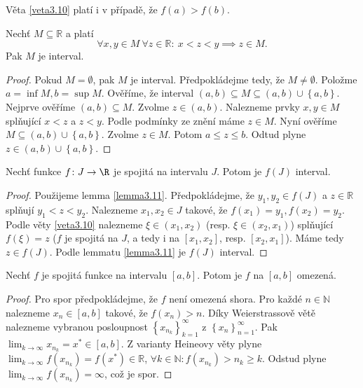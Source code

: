 \begin{poznamka}
	Věta \ref{veta3.10} platí i v případě, že $f(a) >f(b)$.
\end{poznamka}

\begin{lemma}\label{lemma3.11} %
Nechť $M\subseteq \mathbb R $ a platí
$$\forall x,y\in M\ \forall z\in \mathbb R :\ x<z<y\implies z\in M.$$
Pak $M$ je interval.
\end{lemma}

\begin{proof}
	Pokud $M = \emptyset$, pak $M$ je interval. Předpokládejme tedy, že $M\ne \emptyset$.
	Položme $a=\inf M, b =\sup M$. Ověříme, že interval $(a,b) \subseteq M \subseteq (a,b)\cup \left \{ a,b \right \} $.
	Nejprve ověříme $(a,b) \subseteq M$. Zvolme $z\in (a,b)$. Nalezneme prvky $x,y\in M$ splňující
	$x<z$ a $z<y$. Podle podmínky ze znění máme $z\in M$. Nyní ověříme $M \subseteq (a,b)\cup \left \{ a,b \right \} $.
	Zvolme $z\in M$. Potom $a\leq z\leq b$. Odtud plyne $z\in(a,b) \cup \left \{ a,b \right \} $.
\end{proof}

\begin{veta}\label{veta3.12} %
Nechť funkce $f\colon J\to\R$ je spojitá na intervalu $J$. Potom je $f(J)$ interval.
\end{veta}

\begin{proof}
	Použijeme lemma \ref{lemma3.11}. Předpokládejme, že $y_1,y_2 \in f(J)$ a $z\in \mathbb R $
	splňují $y_1 < z < y_2$. Nalezneme $x_1,x_2 \in J$ takové, že $f(x_1) = y_1, f(x_2) = y_2$.
	Podle věty \ref{veta3.10} nalezneme $\xi \in (x_1, x_2)$ (resp. $\xi \in (x_2, x_1)$) splňující
	$f(\xi) = z$ ($f$ je spojitá na $J$, a tedy i na $\left [ x_1,x_2 \right ] $, resp. $\left [ x_2,x_1 \right ] $).
	Máme tedy $z\in f(J)$. Podle lemmatu \ref{lemma3.11} je $f(J)$ interval.
\end{proof}

\begin{veta}\label{veta3.13}%
Nechť $f$ je spojitá funkce na intervalu $[a,b]$. Potom je $f$ na $[a,b]$ omezená.
\end{veta}

\begin{proof}
	Pro spor předpokládejme, že $f$ není omezená shora. Pro každé $n\in \mathbb N $
	nalezneme $x_n \in \left [ a,b \right ] $ takové, že $f(x_n) > n$. Díky Weierstrassově větě
	nalezneme vybranou posloupnost $\left \{ x_{n_k} \right \}_{k=1}^\infty $ z $\left \{ x_n \right \}_{n=1}^\infty $.
	Pak $\lim_{k \to \infty} x_{n_k} = x^* \in \left [ a,b \right ] $. Z varianty Heineovy věty plyne
	$\lim_{k \to \infty} f(x_{n_k})=f(x^*)\in \mathbb R $, $\forall k \in \mathbb N : f(x_{n_k}) > n_k \geq k$.
	Odstud plyne $\lim_{k \to \infty} f(x_{n_k}) = \infty$, což je spor.
\end{proof}

